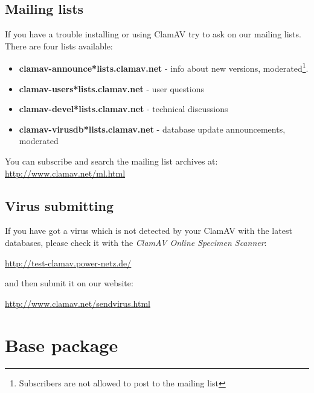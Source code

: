\documentclass[a4paper,titlepage,12pt]{article}
\begin{document}
    \subsection{Mailing lists}
    If you have a trouble installing or using ClamAV try to ask on our mailing
    lists. There are four lists available:
    \begin{itemize}
    \item \textbf{clamav-announce*lists.clamav.net} - info about new versions,
    moderated\footnote{Subscribers are not allowed to post to the mailing
    list}.
    \item \textbf{clamav-users*lists.clamav.net} - user questions
    \item \textbf{clamav-devel*lists.clamav.net} - technical discussions
    \item \textbf{clamav-virusdb*lists.clamav.net} - database update announcements, moderated
    \end{itemize}
    \noindent You can subscribe and search the mailing list archives at: 
    \url{http://www.clamav.net/ml.html}\\

    \subsection{Virus submitting}
    If you have got a virus which is not detected by your ClamAV with the latest
    databases, please check it with the \emph{ClamAV Online Specimen Scanner}:
    \begin{center}
	\url{http://test-clamav.power-netz.de/}
    \end{center}
    and then submit it on our website:
    \begin{center}
	\url{http://www.clamav.net/sendvirus.html}
    \end{center}

    \section{Base package}
\end{document}
